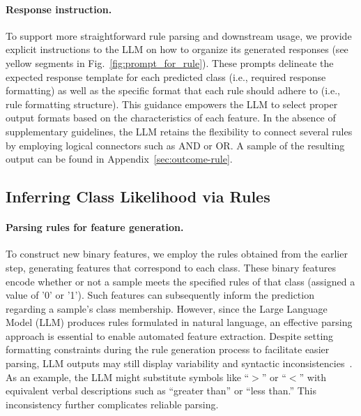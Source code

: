\vspace*{-0.12in}
\paragraph{Response instruction.} To support more straightforward rule parsing and downstream usage, we provide explicit instructions to the LLM on how to organize its generated responses (see yellow segments in Fig.~\ref{fig:prompt_for_rule}). These prompts delineate the expected response template for each predicted class (i.e., required response formatting) as well as the specific format that each rule should adhere to (i.e., rule formatting structure). This guidance empowers the LLM to select proper output formats based on the characteristics of each feature. In the absence of supplementary guidelines, the LLM retains the flexibility to connect several rules by employing logical connectors such as AND or OR. A sample of the resulting output can be found in Appendix~\ref{sec:outcome-rule}.

\subsection{Inferring Class Likelihood via Rules}
\label{Sec:training}

\paragraph{Parsing rules for feature generation.} To construct new binary features, we employ the rules obtained from the earlier step, generating features that correspond to each class. These binary features encode whether or not a sample meets the specified rules of that class (assigned a value of '0' or '1'). Such features can subsequently inform the prediction regarding a sample’s class membership. However, since the Large Language Model (LLM) produces rules formulated in natural language, an effective parsing approach is essential to enable automated feature extraction. Despite setting formatting constraints during the rule generation process to facilitate easier parsing, LLM outputs may still display variability and syntactic inconsistencies~\cite{kovavc2023large}. As an example, the LLM might substitute symbols like “$>$” or “$<$” with equivalent verbal descriptions such as “greater than” or “less than.” This inconsistency further complicates reliable parsing.

